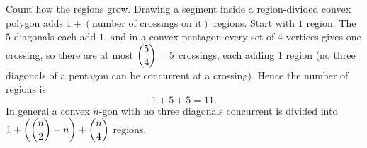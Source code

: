 Count how the regions grow. Drawing a segment inside a region-divided convex polygon adds $1+(\text{number of crossings on it})$ regions. Start with $1$ region. The $5$ diagonals each add $1$, and in a convex pentagon every set of $4$ vertices gives one crossing, so there are at most $\dbinom54=5$ crossings, each adding $1$ region (no three diagonals of a pentagon can be concurrent at a crossing). Hence the number of regions is
\[
1+5+5=\boxed{11}.
\]
In general a convex $n$-gon with no three diagonals concurrent is divided into $1+\left(\dbinom n2-n\right)+\dbinom n4$ regions.
